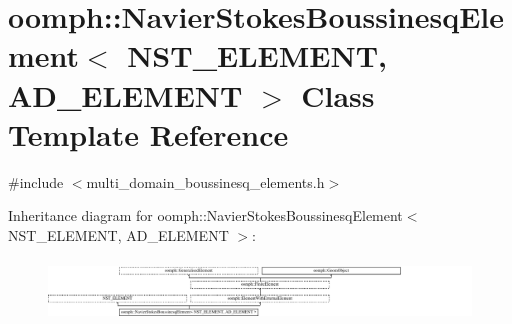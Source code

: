 \hypertarget{classoomph_1_1NavierStokesBoussinesqElement}{}\section{oomph\+:\+:Navier\+Stokes\+Boussinesq\+Element$<$ N\+S\+T\+\_\+\+E\+L\+E\+M\+E\+NT, A\+D\+\_\+\+E\+L\+E\+M\+E\+NT $>$ Class Template Reference}
\label{classoomph_1_1NavierStokesBoussinesqElement}


{\ttfamily \#include $<$multi\+\_\+domain\+\_\+boussinesq\+\_\+elements.\+h$>$}

Inheritance diagram for oomph\+:\+:Navier\+Stokes\+Boussinesq\+Element$<$ N\+S\+T\+\_\+\+E\+L\+E\+M\+E\+NT, A\+D\+\_\+\+E\+L\+E\+M\+E\+NT $>$\+:\begin{figure}[H]
\begin{center}
\leavevmode
\includegraphics[height=1.659259cm]{classoomph_1_1NavierStokesBoussinesqElement}
\end{center}
\end{figure}
